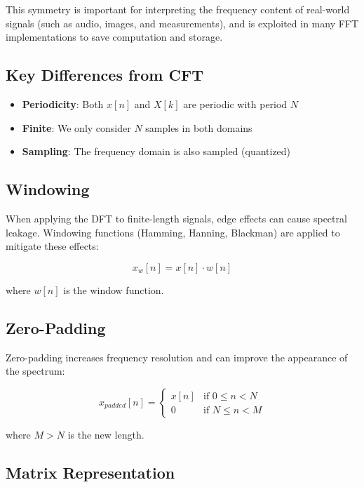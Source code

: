 \documentclass[11pt,a4paper]{article}
\begin{document}
This symmetry is important for interpreting the frequency content of real-world signals (such as audio, images, and measurements), and is exploited in many FFT implementations to save computation and storage.

\subsection{Key Differences from CFT}

\begin{itemize}
    \item \textbf{Periodicity}: Both $x[n]$ and $X[k]$ are periodic with period $N$
    \item \textbf{Finite}: We only consider $N$ samples in both domains
    \item \textbf{Sampling}: The frequency domain is also sampled (quantized)
\end{itemize}

\subsection{Windowing}

When applying the DFT to finite-length signals, edge effects can cause spectral leakage. Windowing functions (Hamming, Hanning, Blackman) are applied to mitigate these effects:

\begin{equation}
x_w[n] = x[n] \cdot w[n]
\end{equation}

where $w[n]$ is the window function.

\subsection{Zero-Padding}

Zero-padding increases frequency resolution and can improve the appearance of the spectrum:

\begin{equation}
x_{padded}[n] = \begin{cases}
x[n] & \text{if } 0 \leq n < N \\
0 & \text{if } N \leq n < M
\end{cases}
\end{equation}

where $M > N$ is the new length.

\subsection{Matrix Representation}
\end{document}
